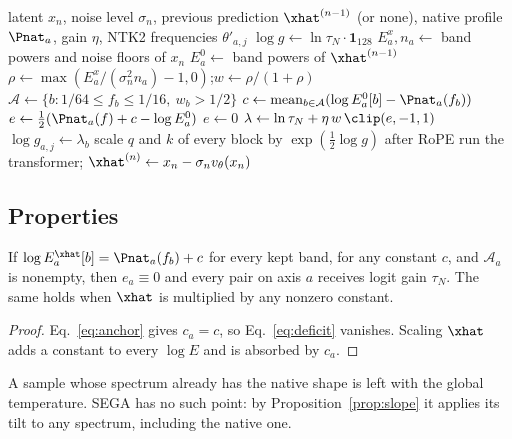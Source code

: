 \begin{algorithm}[t]
\caption{Constancy RoPE, one sampling step (per image).}
\label{alg:crope}
\begin{algorithmic}[1]
\Require latent $x_n$, noise level $\sigma_n$, previous prediction $\xhat^{(n-1)}$ (or none), native profile $\Pnat_a$, gain $\eta$, NTK2 frequencies $\theta'_{a,j}$
\State $\log g \gets \ln\tau_N\cdot\mathbf 1_{128}$ 
    \State $E^{x}_a, n_a \gets$ band powers and noise floors of $x_n$ 
    \State $E^{0}_a \gets$ band powers of $\xhat^{(n-1)}$
    \State $\rho \gets \max(E^x_a/(\sigma_n^2 n_a)-1,0)$;\quad $w\gets\rho/(1+\rho)$ 
    \State $\mathcal A \gets \{b: 1/64\le f_b\le 1/16,\ w_b>1/2\}$
      \State $c\gets \operatorname{mean}_{b\in\mathcal A}(\log E^0_a[b]-\Pnat_a(f_b))$
      \State $e\gets \tfrac12(\Pnat_a(f)+c-\log E^0_a)$ 
    \Else
      \State $e\gets 0$
    \EndIf
    \State $\lambda \gets \ln\tau_N + \eta\, w\,\clip(e,-1,1)$
      \State $\log g_{a,j}\gets\lambda_b$ 
    \EndFor
  \EndFor
\EndIf
\State scale $q$ and $k$ of every block by $\exp(\tfrac12\log g)$ after RoPE
\State run the transformer; $\xhat^{(n)}\gets x_n-\sigma_n v_\theta(x_n)$
\end{algorithmic}
\end{algorithm}

\subsection{Properties}
\label{sec:props}

\begin{proposition}
\label{prop:fixed}
If $\log E_a^{\xhat}[b] = \Pnat_a(f_b)+c$ for every kept band, for any constant $c$, and $\mathcal A_a$ is nonempty, then $e_a\equiv0$ and every pair on axis $a$ receives logit gain $\tau_N$. The same holds when $\xhat$ is multiplied by any nonzero constant.
\end{proposition}
\begin{proof}
Eq.~\eqref{eq:anchor} gives $c_a=c$, so Eq.~\eqref{eq:deficit} vanishes. Scaling $\xhat$ adds a constant to every $\log E$ and is absorbed by $c_a$.
\end{proof}
A sample whose spectrum already has the native shape is left with the global temperature. SEGA has no such point: by Proposition~\ref{prop:slope} it applies its tilt to any spectrum, including the native one.

